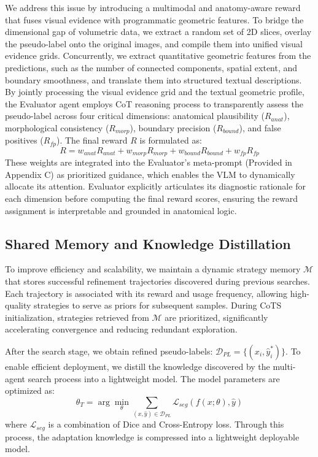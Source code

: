 \documentclass[sigconf, screen]{acmart}
\begin{document}
We address this issue by introducing a multimodal and anatomy-aware reward that fuses visual evidence with programmatic geometric features. To bridge the dimensional gap of volumetric data, we extract a random set of 2D slices, overlay the pseudo-label onto the original images, and compile them into unified visual evidence grids. Concurrently, we extract quantitative geometric features from the predictions, such as the number of connected components, spatial extent, and boundary smoothness, and translate them into structured textual descriptions. By jointly processing the visual evidence grid and the textual geometric profile, the Evaluator agent employs CoT reasoning process to transparently assess the pseudo-label across four critical dimensions: anatomical plausibility ($R_{anat}$), morphological consistency ($R_{morp}$), boundary precision ($R_{bound}$), and false positives ($R_{fp}$). The final reward $R$ is formulated as:
$$R = w_{anat} R_{anat} + w_{morp} R_{morp} + w_{bound} R_{bound} + w_{fp} R_{fp}$$
These weights are integrated into the Evaluator's meta-prompt (Provided in Appendix C) as prioritized guidance, which enables the VLM to dynamically allocate its attention. Evaluator explicitly articulates its diagnostic rationale for each dimension before computing the final reward scores, ensuring the reward assignment is interpretable and grounded in anatomical logic.

\subsection{Shared Memory and Knowledge Distillation}
To improve efficiency and scalability, we maintain a dynamic strategy memory $\mathcal{M}$ that stores successful refinement trajectories discovered during previous searches. Each trajectory is associated with its reward and usage frequency, allowing high-quality strategies to serve as priors for subsequent samples. During CoTS initialization, strategies retrieved from $\mathcal{M}$ are prioritized, significantly accelerating convergence and reducing redundant exploration.

After the search stage, we obtain refined pseudo-labels: $\mathcal{D}_{PL}=\{(x_i,\hat{y}_i^{*})\}$. To enable efficient deployment, we distill the knowledge discovered by the multi-agent search process into a lightweight model. The model parameters are optimized as:
\begin{equation}
\theta_T = \arg\min_{\theta}\sum_{(x,\hat{y})\in\mathcal{D}_{PL}}
\mathcal{L}_{seg}(f(x;\theta),\hat{y})
\end{equation}
where $\mathcal{L}_{seg}$ is a combination of Dice and Cross-Entropy loss. Through this process, the adaptation knowledge is compressed into a lightweight deployable model.
\end{document}
